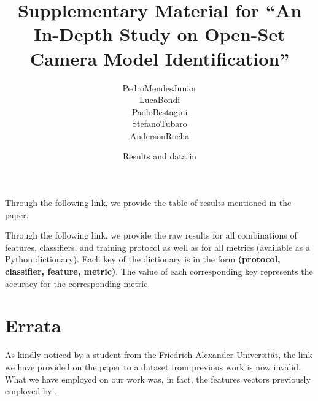 

% 

\renewcommand\highlightauthorname[1]{#1}

\title{{Supplementary Material for ``An In-Depth Study on Open-Set Camera Model Identification''}}
\author{\gls{PedroMendesJunior}\\%
  \gls{LucaBondi}\\%
  \gls{PaoloBestagini}\\%
  \gls{StefanoTubaro}\\%
  \gls{AndersonRocha}\\%
}
\date{Results and data in }



\maketitle


Through the following link, we provide the table of results mentioned in the paper.

\begin{center}
\end{center}

Through the following link, we provide the raw results for all combinations of features, classifiers, and training protocol as well as for all metrics (available as a Python dictionary).
Each key of the dictionary is in the form \textbf{(protocol, classifier, feature, metric)}. The value of each corresponding key represents the accuracy for the corresponding metric.

\begin{center}
\end{center}

\section*{Errata}

As kindly noticed by a student from the Friedrich-Alexander-Universität, the link we have provided on the paper to a dataset from previous work is now invalid.  What we have employed on our work was, in fact, the features vectors previously employed by .

